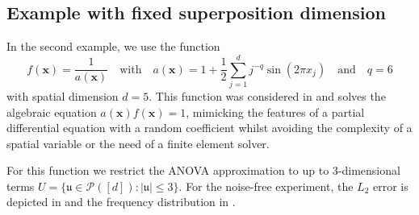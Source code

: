 \documentclass[a4paper]{scrartcl}
\numberwithin{equation}{section}
\begin{document}
\subsection{Example with fixed superposition dimension} 

In the second example, we use the function
\begin{equation*}
    f(\bm x) = \frac{1}{a(\bm x)}
    \quad\text{with}\quad
    a(\bm x) = 1+\frac{1}{2}\sum_{j=1}^{d} j^{-q} \sin(2\pi x_j)
    \quad\text{and}\quad
    q=6
\end{equation*}
with spatial dimension $d=5$.
This function was considered in \cite{KKNS25,BGKS25} and solves the algebraic equation $a(\bm x)f(\bm x) = 1$, mimicking the features of a partial differential equation with a random coefficient whilst avoiding the complexity of a spatial variable or the need of a finite element solver.

For this function we restrict the ANOVA approximation to up to $3$-dimensional terms $U = \{\mathfrak u\in\mathcal P([d]) : |\mathfrak u| \le 3\}$.
For the noise-free experiment, the $L_2$ error is depicted in  and the frequency distribution in .
\end{document}
